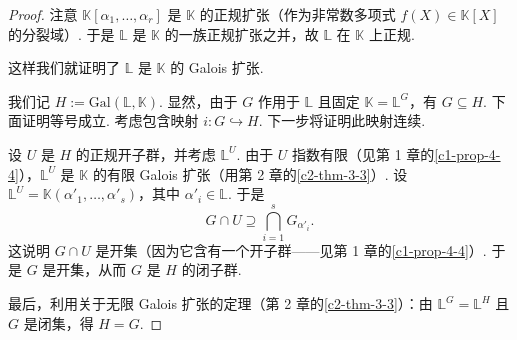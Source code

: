 \begin{proof}
注意 $\mathbb{K}[\alpha_1,\ldots,\alpha_r]$ 是 $\mathbb{K}$ 的正规扩张（作为非常数多项式 $f(X)\in\mathbb{K}[X]$ 的分裂域）. 于是 $\mathbb{L}$ 是 $\mathbb{K}$ 的一族正规扩张之并，故 $\mathbb{L}$ 在 $\mathbb{K}$ 上正规.

这样我们就证明了 $\mathbb{L}$ 是 $\mathbb{K}$ 的 Galois 扩张.

我们记 $H:=\mathrm{Gal}(\mathbb{L},\mathbb{K})$. 显然，由于 $G$ 作用于 $\mathbb{L}$ 且固定 $\mathbb{K}=\mathbb{L}^G$，有 $G\subseteq H$. 下面证明等号成立. 考虑包含映射 $i:G\hookrightarrow H$. 下一步将证明此映射连续.

设 $U$ 是 $H$ 的正规开子群，并考虑 $\mathbb{L}^U$. 由于 $U$ 指数有限（见第 1 章的\autoref{c1-prop-4-4}），$\mathbb{L}^U$ 是 $\mathbb{K}$ 的有限 Galois 扩张（用第 2 章的\autoref{c2-thm-3-3}）. 设 $\mathbb{L}^U=\mathbb{K}(\alpha'_1,\ldots,\alpha'_s)$，其中 $\alpha'_i\in\mathbb{L}$. 于是
\[
G\cap U\supseteq\bigcap_{i=1}^s G_{\alpha'_i}.
\]
这说明 $G\cap U$ 是开集（因为它含有一个开子群——见第 1 章的\autoref{c1-prop-4-4}）. 于是 $G$ 是开集，从而 $G$ 是 $H$ 的闭子群.

最后，利用关于无限 Galois 扩张的定理（第 2 章的\autoref{c2-thm-3-3}）：由 $\mathbb{L}^G=\mathbb{L}^H$ 且 $G$ 是闭集，得 $H=G$.
\end{proof}
